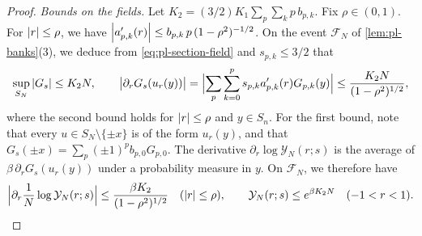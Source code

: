 \begin{proof}
\emph{Bounds on the fields.} Let $K_2=(3/2)K_1\sum_p\sum_kp\,b_{p,k}$. Fix $\rho\in(0,1)$. For $\left|r\right|\le\rho$, we have $\left|a_{p,k}'(r)\right|\le b_{p,k}\,p\,(1-\rho^2)^{-1/2}$. On the event $\mathcal F_N$ of \cref{lem:pl-banks}(3), we deduce from \eqref{eq:pl-section-field} and $s_{p,k}\le3/2$ that
\[
\sup_{S_N}\left|G_s\right|\le K_2N,\qquad
\bigl|\partial_rG_s(u_r(y))\bigr|=\Bigl|\sum_p\sum_{k=0}^ps_{p,k}a_{p,k}'(r)G_{p,k}(y)\Bigr|\le\frac{K_2N}{(1-\rho^2)^{1/2}},
\]
where the second bound holds for $\left|r\right|\le\rho$ and $y\in S_n$.
For the first bound, note that every $u\in S_N\setminus\{\pm x\}$ is of the form $u_r(y)$, and that $G_s(\pm x)=\sum_p(\pm1)^pb_{p,0}G_{p,0}$. The derivative $\partial_r\log\mathcal Y_N(r;s)$ is the average of $\beta\,\partial_rG_s(u_r(y))$ under a probability measure in $y$. On $\mathcal F_N$, we therefore have
\begin{equation}\label{eq:pl-lip-Y}
\Bigl|\partial_r\frac1N\log\mathcal Y_N(r;s)\Bigr|\le\frac{\beta K_2}{(1-\rho^2)^{1/2}}\quad(\left|r\right|\le\rho),
\qquad
\mathcal Y_N(r;s)\le e^{\beta K_2N}\quad(-1<r<1).
\end{equation}


\end{proof}
